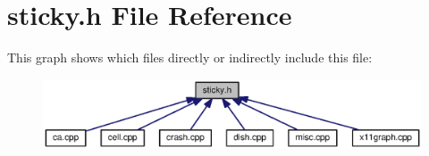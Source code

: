 \section{sticky.\-h File Reference}
\label{sticky_8h}
This graph shows which files directly or indirectly include this file\-:
\nopagebreak
\begin{figure}[H]
\begin{center}
\leavevmode
\includegraphics[width=350pt]{sticky_8h__dep__incl}
\end{center}
\end{figure}
